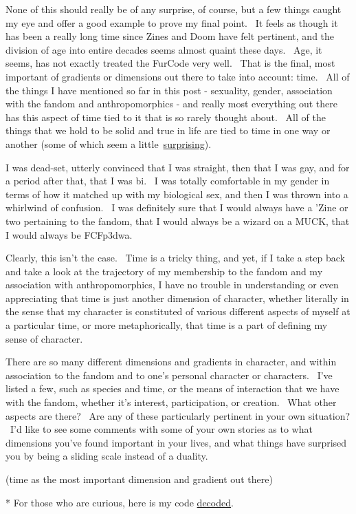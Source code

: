 None of this should really be of any surprise, of course, but a few
things caught my eye and offer a good example to prove my final point.
~It feels as though it has been a really long time since Zines and Doom
have felt pertinent, and the division of age into entire decades seems
almost quaint these days. ~Age, it seems, has not exactly treated the
FurCode very well. ~That is the final, most important of gradients or
dimensions out there to take into account: time. ~All of the things I
have mentioned so far in this post - sexuality, gender, association with
the fandom and anthropomorphics - and really most everything out there
has this aspect of time tied to it that is so rarely thought about. ~All
of the things that we hold to be solid and true in life are tied to time
in one way or another (some of which seem a
little~\href{http://discovermagazine.com/2009/mar/08-kilogram-isn.t-what-it-used-to-be-it.s-lighter}{surprising}).

I was dead-set, utterly convinced that I was straight, then that I was
gay, and for a period after that, that I was bi. ~I was totally
comfortable in my gender in terms of how it matched up with my
biological sex, and then I was thrown into a whirlwind of confusion. ~I
was definitely sure that I would always have a 'Zine or two pertaining
to the fandom, that I would always be a wizard on a MUCK, that I would
always be FCFp3dwa.

Clearly, this isn't the case. ~Time is a tricky thing, and yet, if I
take a step back and take a look at the trajectory of my membership to
the fandom and my association with anthropomorphics, I have no trouble
in understanding or even appreciating that time is just another
dimension of character, whether literally in the sense that my character
is constituted of various different aspects of myself at a particular
time, or more metaphorically, that time is a part of defining my sense
of character.

There are so many different dimensions and gradients in character, and
within association to the fandom and to one's personal character or
characters. ~I've listed a few, such as species and time, or the means
of interaction that we have with the fandom, whether it's interest,
participation, or creation. ~What other aspects are there? ~Are any of
these particularly pertinent in your own situation? ~I'd like to see
some comments with some of your own stories as to what dimensions you've
found important in your lives, and what things have surprised you by
being a sliding scale instead of a duality.

(time as the most important dimension and gradient out there)

* For those who are curious, here is my code
\href{http://winterwolf.co.uk/furcode?D=FCA3amr+A-+C\%2B\%2B+D\%2B+H\%2B+M\%2B\%2B+P+R+T+W\%2B+Z+Sm\%2B+RLCT+a+cl\%2B\%2B\%2B+d\%21+e\%2B\%2B+f\%2B+h\%2B\%2B\%2B+iwf\%2B\%2B\%2B+j\%2B+p\%2B+sm\%2B}{decoded}.

